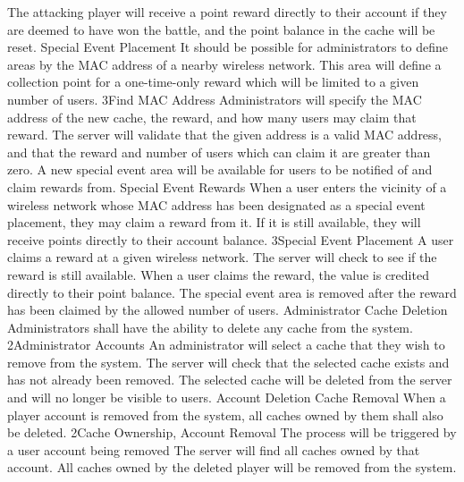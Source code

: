 			{The attacking player will receive a point reward directly to 
			their account if they are deemed to have won the battle, and the 
			point balance in the cache will be reset.}
		\funcreq
			{Special Event Placement}
			{It should be possible for administrators to define areas by the 
			MAC address of a nearby wireless network. This area will define a 
			collection point for a one-time-only reward which will be limited 
			to a given number of users.}
			{3}{Find MAC Address}
			{Administrators will specify the MAC address of the new cache, the 
			reward, and how many users may claim that reward.}
			{The server will validate that the given address is a valid MAC 
			address, and that the reward and number of users which can claim 
			it are greater than zero.}
			{A new special event area will be available for users to be 
			notified of and claim rewards from.}
		\funcreq
			{Special Event Rewards}
			{When a user enters the vicinity of a wireless network whose MAC 
			address has been designated as a special event placement, they may 
			claim a reward from it. If it is still available, they will 
			receive points directly to their account balance.}
			{3}{Special Event Placement}
			{A user claims a reward at a given wireless network.}
			{The server will check to see if the reward is still available.}
			{When a user claims the reward, the value is credited directly to 
			their point balance. The special event area is removed after the 
			reward has been claimed by the allowed number of users.}
		\funcreq
			{Administrator Cache Deletion}
			{Administrators shall have the ability to delete any cache from the system.}
			{2}{Administrator Accounts}
			{An administrator will select a cache that they wish to remove from the system.}
			{The server will check that the selected cache exists and has not already been removed.}
			{The selected cache will be deleted from the server and will no longer be visible to users.}
		\funcreq
			{Account Deletion Cache Removal}
			{When a player account is removed from the system, all caches owned by them shall also be deleted.}
			{2}{Cache Ownership, Account Removal}
			{The process will be triggered by a user account being removed}
			{The server will find all caches owned by that account.}
			{All caches owned by the deleted player will be removed from the system.}
